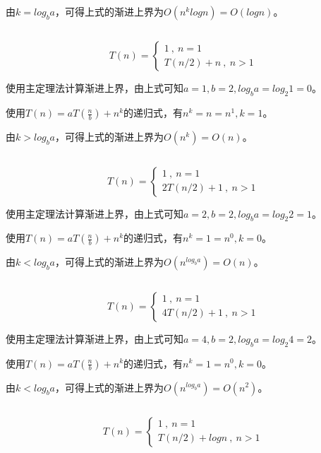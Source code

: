 \documentclass{article}
\begin{document}
由$k=log_b a$，可得上式的渐进上界为$O(n^{k}logn)=O(logn)$。

\subsection{}

$$
T(n)=\left\{
\begin{array}{l}
1\ ,\ n=1\\
T(n/2)+n\ ,\ n>1
\end{array}
\right.
$$

使用主定理法计算渐进上界，由上式可知$a=1,b=2,log_b a=log_{2}1=0$。

使用$T(n)=aT(\frac{n}{b})+n^k$的递归式，有$n^k=n=n^1,k=1$。

由$k>log_b a$，可得上式的渐进上界为$O(n^{k})=O(n)$。
\subsection{}

$$
T(n)=\left\{
\begin{array}{l}
1\ ,\ n=1\\
2T(n/2)+1\ ,\ n>1
\end{array}
\right.
$$

使用主定理法计算渐进上界，由上式可知$a=2,b=2,log_b a=log_{2}2=1$。

使用$T(n)=aT(\frac{n}{b})+n^k$的递归式，有$n^k=1=n^0,k=0$。

由$k<log_b a$，可得上式的渐进上界为$O(n^{log_b a})=O(n)$。

\subsection{}

$$
T(n)=\left\{
\begin{array}{l}
1\ ,\ n=1\\
4T(n/2)+1\ ,\ n>1
\end{array}
\right.
$$

使用主定理法计算渐进上界，由上式可知$a=4,b=2,log_b a=log_{2}4=2$。

使用$T(n)=aT(\frac{n}{b})+n^k$的递归式，有$n^k=1=n^0,k=0$。

由$k<log_b a$，可得上式的渐进上界为$O(n^{log_b a})=O(n^2)$。

\subsection{}

$$
T(n)=\left\{
\begin{array}{l}
1\ ,\ n=1\\
T(n/2)+logn\ ,\ n>1
\end{array}
\right.
$$
\end{document}
